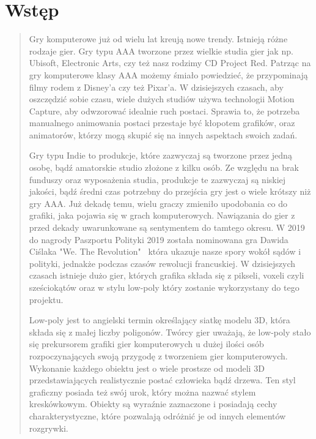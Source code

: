 \chapter*{Wstęp}
\begin{quotation}
\indent Gry komputerowe już od wielu lat kreują nowe trendy. Istnieją różne rodzaje gier.
Gry typu AAA tworzone przez wielkie studia gier jak np. Ubisoft, Electronic Arts, czy też nasz rodzimy CD Project Red. 
Patrząc na gry komputerowe klasy AAA możemy śmiało powiedzieć, że przypominają filmy rodem z Disney'a czy też Pixar'a. 
W dzisiejszych czasach, aby oszczędzić sobie czasu, wiele dużych studiów używa technologii Motion Capture, aby odwzorować idealnie ruch postaci. Sprawia to,
że potrzeba manualnego animowania postaci przestaje być kłopotem grafików, oraz animatorów, którzy mogą skupić się na innych aspektach swoich zadań.

\indent Gry typu Indie to produkcje, które zazwyczaj są tworzone przez jedną osobę, bądź amatorskie studio złożone z kilku osób. Ze względu na brak funduszy oraz wyposażenia studia, produkcje te zazwyczaj są niskiej jakości, bądź średni czas potrzebny do przejścia gry jest o wiele krótszy niż gry AAA. Już dekadę temu, wielu graczy zmieniło upodobania co do grafiki, jaka pojawia się w grach komputerowych. Nawiązania do gier z przed dekady uwarunkowane są sentymentem do tamtego okresu. W 2019 do nagrody Paszportu Polityki 2019 została nominowana gra Dawida Ciślaka "We. The Revolution" ~która ukazuje nasze spory wokół sądów i polityki, jednakże podczas czasów rewolucji francuskiej. W dzisiejszych czasach istnieje dużo gier, których grafika składa się z pikseli, voxeli czyli sześciokątów oraz w stylu low-poly który zostanie wykorzystany do tego projektu.

\indent Low-poly jest to angielski termin określający siatkę modelu 3D, która składa się z małej liczby poligonów. Twórcy gier uważają, że low-poly stało się prekursorem grafiki gier komputerowych u dużej ilości osób rozpoczynających swoją przygodę z tworzeniem gier komputerowych. Wykonanie każdego obiektu jest o wiele prostsze od modeli 3D przedstawiających realistycznie postać człowieka bądź drzewa. Ten styl graficzny posiada też swój urok, który można nazwać stylem kreskówkowym. Obiekty są wyraźnie zaznaczone i posiadają cechy charakterystyczne, które pozwalają odróżnić je od innych elementów rozgrywki.

\newpage 
\end{quotation}

